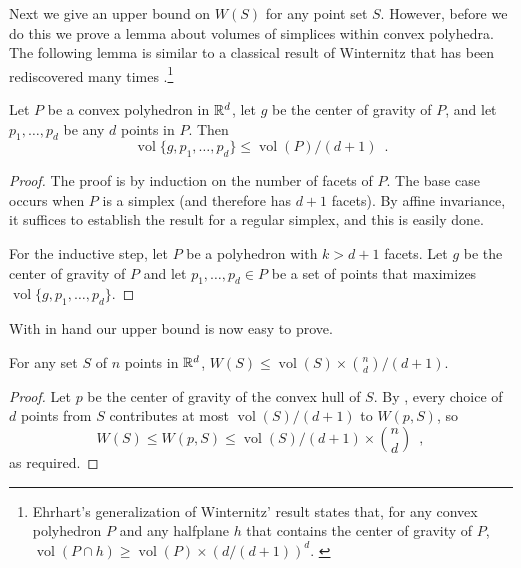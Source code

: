 \documentclass[lotsofwhite]{patmorin}
\DeclareMathOperator{\vol}{vol}
\begin{document}
Next we give an upper bound on $W(S)$ for any point set $S$.  However,
before we do this we prove a lemma about volumes of simplices within
convex polyhedra. The following lemma is similar to a classical result
of Winternitz \cite{X} that has been rediscovered many times
\cite{X}.\footnote{Ehrhart's generalization of Winternitz' result
states that, for any convex polyhedron $P$ and any halfplane $h$ that
contains the center of gravity of $P$, $\vol(P\cap h) \ge
\vol(P)\times (d/(d+1))^d$. \cite{eXX}}

\begin{lem}
Let $P$ be a convex polyhedron in $\mathbb{R}^d$, let $g$ be the center of
gravity of $P$, and let $p_1,\ldots,p_d$ be any $d$ points in $P$. Then
\[
   \vol\{g,p_1,\ldots,p_d\} \le \vol(P) / (d+1) \enspace .
\] 
\end{lem}

\begin{proof}
The proof is by induction on the number of facets of $P$.  The base
case occurs when $P$ is a simplex (and therefore has $d+1$ facets).
By affine invariance, it suffices to establish the result for a
regular simplex, and this is easily done.

For the inductive step, let $P$ be a polyhedron with $k > d+1$
facets.   Let $g$ be the center of gravity of $P$ and let
$p_1,\ldots,p_d\in P$ be a set of points that maximizes
$\vol\{g,p_1,\ldots,p_d\}$.

\end{proof}


With  in hand our upper bound is now easy to prove.

\begin{thm}
For any set $S$ of $n$ points in $\mathbb{R}^d$, $W(S) \le \vol(S)\times {n \choose
d}/(d+1)$.
\end{thm}

\begin{proof}
Let $p$ be the center of gravity of the convex hull of $S$.  By
,
every choice of $d$ points from $S$ contributes at most
$\vol(S)/(d+1)$ to $W(p,S)$, so
\[
    W(S) \le W(p,S) \le \vol(S)/(d+1)\times {n\choose d} \enspace ,
\]
as required.
\end{proof}
\end{document}
